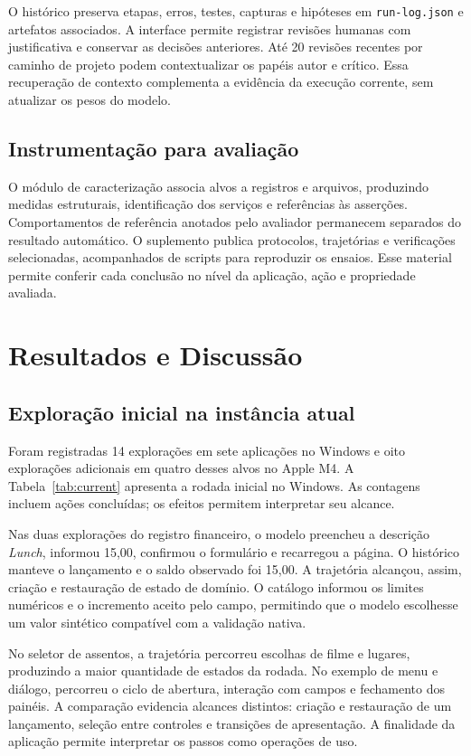 \documentclass[12pt]{article}
\begin{document}
O histórico preserva etapas, erros, testes, capturas e hipóteses em \texttt{run-log.json} e artefatos associados. A interface permite registrar revisões humanas com justificativa e conservar as decisões anteriores. Até 20 revisões recentes por caminho de projeto podem contextualizar os papéis autor e crítico. Essa recuperação de contexto complementa a evidência da execução corrente, sem atualizar os pesos do modelo.

\subsection{Instrumentação para avaliação}
O módulo de caracterização associa alvos a registros e arquivos, produzindo medidas estruturais, identificação dos serviços e referências às asserções. Comportamentos de referência anotados pelo avaliador permanecem separados do resultado automático. O suplemento publica protocolos, trajetórias e verificações selecionadas, acompanhados de scripts para reproduzir os ensaios. Esse material permite conferir cada conclusão no nível da aplicação, ação e propriedade avaliada.

\section{Resultados e Discussão}\label{sec:results}
\subsection{Exploração inicial na instância atual}
Foram registradas 14 explorações em sete aplicações no Windows e oito explorações adicionais em quatro desses alvos no Apple M4. A Tabela~\ref{tab:current} apresenta a rodada inicial no Windows. As contagens incluem ações concluídas; os efeitos permitem interpretar seu alcance.



Nas duas explorações do registro financeiro, o modelo preencheu a descrição \textit{Lunch}, informou 15,00, confirmou o formulário e recarregou a página. O histórico manteve o lançamento e o saldo observado foi 15,00. A trajetória alcançou, assim, criação e restauração de estado de domínio. O catálogo informou os limites numéricos e o incremento aceito pelo campo, permitindo que o modelo escolhesse um valor sintético compatível com a validação nativa.

No seletor de assentos, a trajetória percorreu escolhas de filme e lugares, produzindo a maior quantidade de estados da rodada. No exemplo de menu e diálogo, percorreu o ciclo de abertura, interação com campos e fechamento dos painéis. A comparação evidencia alcances distintos: criação e restauração de um lançamento, seleção entre controles e transições de apresentação. A finalidade da aplicação permite interpretar os passos como operações de uso.
\end{document}
